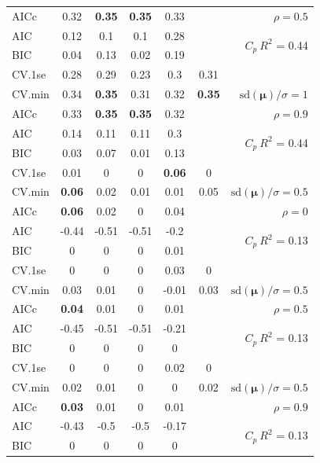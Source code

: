 \documentclass[12pt]{article}
\newcommand{\mr}[1]{\mathrm{#1}}
\newcommand{\bm}[1]{\mathbf{#1}}
\begin{document}
\begin{table}[p]
\begin{center}
\begin{tabular}{l*{5}{c}|r}
AICc & 0.32 & {\bf 0.35} & {\bf 0.35} & 0.33 & & $\rho=0.5$ \\
AIC & 0.12 & 0.1 & 0.1 & 0.28 & & \multirow{2}{*}{$C_p ~ R^2$ = 0.44} \\
BIC & 0.04 & 0.13 & 0.02 & 0.19 & & \\
 \hline 
CV.1se & 0.28 & 0.29 & 0.23 & 0.3 & 0.31 &\\
CV.min & 0.34 & {\bf 0.35} & 0.31 & 0.32 & {\bf 0.35} &  $\mr{sd}(\bm{\mu})/\sigma=1$ \\
AICc & 0.33 & {\bf 0.35} & {\bf 0.35} & 0.32 & & $\rho=0.9$ \\
AIC & 0.14 & 0.11 & 0.11 & 0.3 & & \multirow{2}{*}{$C_p ~ R^2$ = 0.44} \\
BIC & 0.03 & 0.07 & 0.01 & 0.13 & & \\
 \hline 
CV.1se & 0.01 & 0 & 0 & {\bf 0.06} & 0 &\\
CV.min & {\bf 0.06} & 0.02 & 0.01 & 0.01 & 0.05 &  $\mr{sd}(\bm{\mu})/\sigma=0.5$ \\
AICc & {\bf 0.06} & 0.02 & 0 & 0.04 & & $\rho=0$ \\
AIC & -0.44 & -0.51 & -0.51 & -0.2 & & \multirow{2}{*}{$C_p ~ R^2$ = 0.13} \\
BIC & 0 & 0 & 0 & 0.01 & & \\
 \hline 
CV.1se & 0 & 0 & 0 & 0.03 & 0 &\\
CV.min & 0.03 & 0.01 & 0 & -0.01 & 0.03 &  $\mr{sd}(\bm{\mu})/\sigma=0.5$ \\
AICc & {\bf 0.04} & 0.01 & 0 & 0.01 & & $\rho=0.5$ \\
AIC & -0.45 & -0.51 & -0.51 & -0.21 & & \multirow{2}{*}{$C_p ~ R^2$ = 0.13} \\
BIC & 0 & 0 & 0 & 0 & & \\
 \hline 
CV.1se & 0 & 0 & 0 & 0.02 & 0 &\\
CV.min & 0.02 & 0.01 & 0 & 0 & 0.02 &  $\mr{sd}(\bm{\mu})/\sigma=0.5$ \\
AICc & {\bf 0.03} & 0.01 & 0 & 0.01 & & $\rho=0.9$ \\
AIC & -0.43 & -0.5 & -0.5 & -0.17 & & \multirow{2}{*}{$C_p ~ R^2$ = 0.13} \\
BIC & 0 & 0 & 0 & 0 & & \\
 \hline 
\end{tabular}
\end{center}
\vspace{-1cm}
\end{table}
\end{document}
